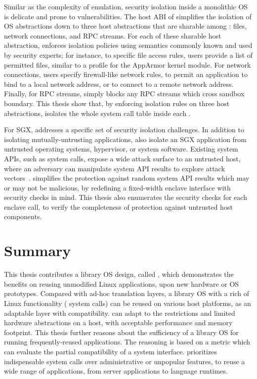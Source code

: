 Similar as the complexity of emulation,
security isolation inside a monolithic OS is delicate and prone to vulnerabilities.
The host ABI of \graphene{} simplifies
the isolation of OS abstractions
down to three host abstractions that are sharable among \picoprocs{}: files, network connections, and RPC streams.
For each of these sharable host abstraction, \graphene{} enforces isolation policies using semantics
commonly known and used by security experts;
for instance, to specific file access rules, users provide a list of permitted files, similar to a profile for the AppArmor kernel module.
For network connections,
users specify firewall-like network rules,
to permit an application
to bind to a local network address, or to connect to a remote network address.
Finally, for RPC streams,
\graphene{} simply blocks any RPC streams
which cross sandbox boundary.
This thesis show that,
by enforcing isolation rules on three host abstractions,
\thehostabi{} isolates the whole system call table inside each \picoproc{}.



For SGX, \graphene{} addresses a specific set of security isolation challenges.
In addition to isolating mutually-untrusting applications,
\graphene{} also isolate an SGX application
from untrusted operating systems, hypervisor, or system software.
Existing system APIs, such as system calls, expose a wide attack surface
to an untrusted host, where an adversary
can manipulate system API results to explore attack vectors~\cite{checkoway13iago}.
\graphene{} simplifies
the protection against random system API results which may or may not be malicious,
by redefining a fixed-width enclave interface
with security checks in mind.
This thesis also enumerates the security checks for each enclave call,
to verify the completeness
of protection against untrusted host components.









\section{Summary}

This thesis contributes a library OS design, called \graphene{},
which demonstrates the benefits on reusing unmodified Linux applications, upon new hardware or OS prototypes.
Compared with ad-hoc translation layers,
a library OS with a rich of Linux functionality (\graphenesyscallnum{} system calls) can be reused on various host platforms, as an adaptable layer with compatibility.
\graphene{} can adapt to the restrictions and
limited hardware abstractions on a host, with acceptable performance and memory footprint.
This thesis further reasons about the sufficiency of a library OS
for running frequently-reused applications. The reasoning is based on a metric which can evaluate the partial compatibility of a system interface.
\graphene{} prioritizes indispensable system calls over administrative or unpopular features,
to reuse a wide range of applications, from server applications to language runtimes.


